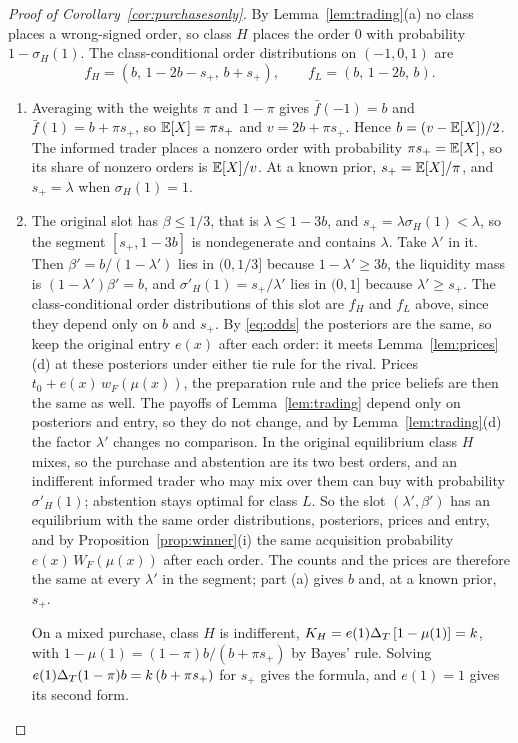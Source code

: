 \begin{proof}[Proof of Corollary~\ref{cor:purchasesonly}]
By Lemma~\ref{lem:trading}(a) no class places a wrong-signed order, so class \(H\) places the order \(0\) with
probability \(1-\sigma_H(1)\). The class-conditional order distributions on \((-1,0,1)\) are
\[
f_H=(b,\,1-2b-s_+,\,b+s_+),\qquad f_L=(b,\,1-2b,\,b).
\]
\begin{enumerate}[label=(\alph*),leftmargin=2em]
\item Averaging with the weights \(\pi\) and \(1-\pi\) gives \(\bar f(-1)=b\) and \(\bar f(1)=b+\pi s_+\), so
\(\mathbb{E}[X]=\pi s_+\) and \(v=2b+\pi s_+\). Hence \(b=(v-\mathbb{E}[X])/2\). The informed trader places a nonzero order with
probability \(\pi s_+=\mathbb{E}[X]\), so its share of nonzero orders is \(\mathbb{E}[X]/v\). At a known prior, \(s_+=\mathbb{E}[X]/\pi\), and
\(s_+=\lambda\) when \(\sigma_H(1)=1\).
\item The original slot has \(\beta\le1/3\), that is \(\lambda\le1-3b\), and \(s_+=\lambda\sigma_H(1)<\lambda\), so the
segment \([s_+,1-3b]\) is nondegenerate and contains \(\lambda\). Take \(\lambda'\) in it. Then \(\beta'=b/(1-\lambda')\)
lies in \((0,1/3]\) because \(1-\lambda'\ge3b\), the liquidity mass is \((1-\lambda')\beta'=b\), and
\(\sigma'_H(1)=s_+/\lambda'\) lies in \((0,1]\) because \(\lambda'\ge s_+\). The class-conditional order distributions of this slot
are \(f_H\) and \(f_L\) above, since they depend only on \(b\) and \(s_+\). By \eqref{eq:odds} the posteriors are the
same, so keep the original entry \(e(x)\) after each order: it meets Lemma~\ref{lem:prices}(d) at these posteriors
under either tie rule for the rival. Prices \(t_0+e(x)\,w_F(\mu(x))\), the preparation rule and the price beliefs are then the
same as well. The payoffs of Lemma~\ref{lem:trading} depend only on posteriors and entry, so they do not change, and
by Lemma~\ref{lem:trading}(d) the factor \(\lambda'\) changes no comparison. In the original equilibrium class \(H\)
mixes, so the purchase and abstention are its two best orders, and an indifferent informed trader who may mix over them can
buy with probability \(\sigma'_H(1)\); abstention stays optimal for class \(L\). So the slot \((\lambda',\beta')\) has an
equilibrium with the same order distributions, posteriors, prices and entry, and by Proposition~\ref{prop:winner}(i) the same
acquisition probability \(e(x)\,W_F(\mu(x))\) after each order. The counts and the prices are therefore the same at
every \(\lambda'\) in the segment; part (a) gives \(b\) and, at a known prior, \(s_+\).

On a mixed purchase, class \(H\) is indifferent, \(K_H=e(1)\Delta_T\,[1-\mu(1)]=k\), with
\(1-\mu(1)=(1-\pi)b/(b+\pi s_+)\) by Bayes' rule. Solving \(e(1)\Delta_T(1-\pi)b=k\,(b+\pi s_+)\) for \(s_+\) gives the
formula, and \(e(1)=1\) gives its second form.\qedhere
\end{enumerate}
\end{proof}

